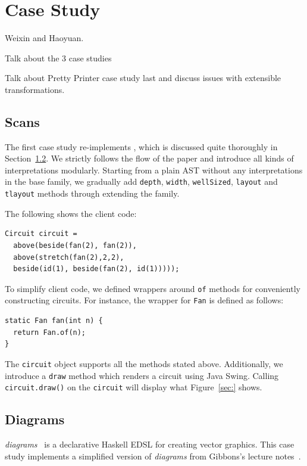 \section{Case Study}

Weixin and Haoyuan.

Talk about the 3 case studies

Talk about Pretty Printer case study last and discuss issues with
extensible transformations.

\subsection{Scans}
The first case study re-implements \dsl, which is discussed quite thoroughly in
Section~\ref{}.
We strictly follows the flow of the paper and introduce all kinds of
interpretations modularly.
Starting from a plain AST without any interpretations in the base family, we gradually add
\texttt{depth}, \texttt{width}, \texttt{wellSized}, \texttt{layout} and
\texttt{tlayout} methods through extending the family.

The following shows the client code:
\begin{lstlisting}
Circuit circuit =
  above(beside(fan(2), fan(2)),
  above(stretch(fan(2),2,2),
  beside(id(1), beside(fan(2), id(1)))));
\end{lstlisting}

To simplify client code, we defined wrappers around \texttt{of} methods
for conveniently constructing circuits. For instance, the wrapper for
\texttt{Fan} is defined as follows:
\begin{lstlisting}
static Fan fan(int n) {
  return Fan.of(n);
}
\end{lstlisting}
The \texttt{circuit} object supports all the methods stated above.
Additionally, we introduce a \texttt{draw} method which renders a
circuit using Java Swing.
Calling \texttt{circuit.draw()} on the \texttt{circuit} will
display what Figure~\ref{sec:} shows.

\begin{figure}
\end{figure}



\subsection{Diagrams}
\emph{diagrams}~\cite{yates2015diagrams} is a declarative Haskell EDSL for creating vector graphics.
This case study implements a simplified version of \emph{diagrams} from
Gibbons's lecture notes~\cite{gibbonsexercises}.


